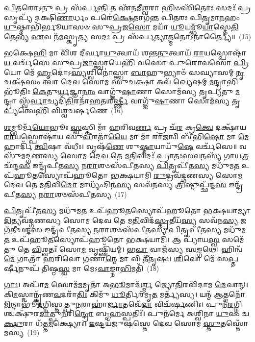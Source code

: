 \-\ul{𑌪𑌿}\-𑌤𑌰𑍋\-𑌽\-\ul{𑌨𑍁} 𑌪𑍍𑌰 𑌸᳴𑌰𑍍𑌪\-\ul{𑌨𑍍𑌤𑌿} 𑌤 𑌏᳴𑌨𑌮𑍀\-\ul{𑌶𑍍𑌵}\-𑌰𑌾 𑌹𑌿𑍞𑌸𑌿᳴\-\ul{𑌤𑍋𑌃} 𑌸𑌦𑌃᳴ \ul{𑌪𑍍𑌰}\-𑌸𑍃𑌪𑍍𑌯᳴ 𑌦𑌕𑍍𑌷𑌿\-\ul{𑌣𑌾}\-𑌰𑍍𑌧𑌂 𑌪𑌰𑍇॑\-\ul{𑌕𑍍𑌷𑍇}\-𑌤𑌾𑌗᳴𑌨𑍍𑌤 𑌪𑌿𑌤𑌰𑌃 𑌪𑌿\-\ul{𑌤𑍃}\-𑌮𑌾\-\ul{𑌨}\-𑌹𑌂 \ul{𑌯𑍁}\-𑌷𑍍𑌮𑌾𑌭𑌿᳴𑌰𑍍𑌭𑍂𑌯𑌾𑌸𑍞 𑌸𑍁\-\ul{𑌪𑍍𑌰}\-𑌜\-\ul{𑌸𑍋} 𑌮𑌯𑌾᳴ \ul{𑌯𑍂}\-𑌯𑌮𑍍𑌭𑍂᳴\-\ul{𑌯𑌾}\-𑌸𑍍𑌤𑍇\-\ul{𑌤𑌿} 𑌤𑍇𑌭𑍍𑌯᳴ \ul{𑌏}\-𑌵 𑌨᳴\-\ul{𑌮}\-𑌸𑍍𑌕𑍃\-\ul{𑌤𑍍𑌯} 𑌸\-\ul{𑌦𑌃} 𑌪𑍍𑌰 𑌸᳴𑌰𑍍𑌪\-\ul{𑌤𑍍𑌯𑌾}\-𑌤𑍍𑌮𑌨𑍋\-𑌽𑌨𑌾॑𑌰𑍍𑌤𑍍𑌯𑍈॥~(15)

{\anuvakamend[{\-\ul{𑌮}\-𑌖𑍋 𑌵𑌾 \ul{𑌅}\-𑌨𑍍𑌤𑌰𑌿᳴𑌕𑍍𑌷𑌾\-\ul{𑌤𑍍𑌪𑍍𑌰}\-𑌸𑌰𑍍𑌪᳴\-\ul{𑌨𑍍𑌤}\-𑌨𑍍𑌤𑍍𑌰𑌯᳴𑌸𑍍𑌤𑍍𑌰𑌿𑍞𑌶𑌚𑍍𑌚}]}%

𑌭𑌕𑍍𑌷𑍇\-\ul{𑌹𑌿} 𑌮𑌾 𑌵𑌿᳴𑌶 𑌦𑍀𑌰𑍍𑌘𑌾\-\ul{𑌯𑍁}\-𑌤𑍍𑌵𑌾𑌯᳴ 𑌶𑌨𑍍𑌤\-\ul{𑌨𑍁}\-𑌤𑍍𑌵𑌾𑌯᳴ \ul{𑌰𑌾}\-𑌯𑌸𑍍𑌪𑍋𑌷𑌾᳴\-\ul{𑌯} 𑌵𑌰𑍍𑌚᳴𑌸𑍇 𑌸𑍁𑌪𑍍𑌰\-\ul{𑌜𑌾}\-𑌸𑍍𑌤𑍍𑌵𑌾𑌯𑍇𑌹𑌿᳴ 𑌵𑌸𑍋 𑌪𑍁𑌰𑍋𑌵𑌸𑍋 \ul{𑌪𑍍𑌰𑌿}\-𑌯𑍋 𑌮𑍇᳴ \ul{𑌹𑍃}\-𑌦𑍋॑\-𑌽\-\ul{𑌸𑍍𑌯}\-𑌶𑍍𑌵𑌿𑌨𑍋॑𑌸𑍍𑌤𑍍𑌵𑌾 \ul{𑌬𑌾}\-𑌹𑍁𑌭𑍍𑌯𑌾𑍞᳴ 𑌸𑌘𑍍𑌯𑌾𑌸𑌮𑍍 \ul{𑌨𑍃}\-𑌚𑌕𑍍𑌷᳴𑌸𑌂 𑌤𑍍𑌵𑌾 𑌦𑍇𑌵 𑌸𑍋𑌮 \ul{𑌸𑍁}\-𑌚\-\ul{𑌕𑍍𑌷𑌾} 𑌅𑌵᳴ 𑌖𑍍𑌯𑍇𑌷𑌮𑍍 \ul{𑌮}\-𑌨𑍍𑌦𑍍𑌰𑌾𑌭𑌿𑌭𑍂᳴𑌤𑌿𑌃 \ul{𑌕𑍇}\-𑌤𑍁\-\ul{𑌰𑍍𑌯}\-𑌜𑍍𑌞𑌾\-\ul{𑌨𑌾𑌂} 𑌵𑌾𑌗𑍍𑌜𑍁᳴\-\ul{𑌷𑌾}\-𑌣𑌾 𑌸𑍋𑌮᳴𑌸𑍍𑌯 𑌤𑍃𑌪𑍍𑌯𑌤𑍁 \ul{𑌮}\-𑌨𑍍𑌦𑍍𑌰𑌾 𑌸𑍍𑌵᳴\-\ul{𑌰𑍍𑌵𑌾}\-𑌚𑍍𑌯𑌦𑌿᳴\-\ul{𑌤𑌿}\-𑌰𑌨𑌾᳴𑌹𑌤𑌶𑍀\-\ul{𑌰𑍍𑌷𑍍𑌣𑍀} 𑌵𑌾𑌗𑍍𑌜𑍁᳴\-\ul{𑌷𑌾}\-𑌣𑌾 𑌸𑍋𑌮᳴𑌸𑍍𑌯 𑌤𑍃\-\ul{𑌪𑍍𑌯}\-𑌤𑍍𑌵𑍇𑌹𑌿᳴ 𑌵𑌿𑌶𑍍𑌵𑌚𑌰𑍍\mbox{}𑌷𑌣𑍇~(16)

\-\ul{𑌶}\-𑌮𑍍𑌭𑍂𑌰𑍍𑌮᳴\-\ul{𑌯𑍋}\-𑌭𑍂𑌃 \ul{𑌸𑍍𑌵}\-𑌸𑍍𑌤𑌿 𑌮𑌾᳴ 𑌹𑌰𑌿𑌵\-\ul{𑌰𑍍𑌣} 𑌪𑍍𑌰 𑌚᳴\-\ul{𑌰} 𑌕𑍍𑌰\-\ul{𑌤𑍍𑌵𑍇} 𑌦𑌕𑍍𑌷𑌾᳴𑌯 \ul{𑌰𑌾}\-𑌯𑌸𑍍𑌪𑍋𑌷𑌾᳴𑌯 𑌸𑍁\-\ul{𑌵𑍀}\-𑌰𑌤𑌾᳴\-\ul{𑌯𑍈} 𑌮𑌾 𑌮𑌾᳴ 𑌰𑌾\-\ul{𑌜}\-𑌨𑍍𑌵𑌿 𑌬𑍀᳴𑌭𑌿\-\ul{𑌷𑍋} 𑌮𑌾 \ul{𑌮𑍇} 𑌹𑌾𑌰𑍍𑌦𑌿᳴ \ul{𑌤𑍍𑌵𑌿}\-𑌷𑌾 𑌵᳴𑌧𑍀𑌃। 𑌵𑍃𑌷᳴\-\ul{𑌣𑍇} 𑌶𑍁\-\ul{𑌷𑍍𑌮𑌾}\-𑌯𑌾𑌯𑍁᳴\-\ul{𑌷𑍇} 𑌵𑌰𑍍𑌚᳴𑌸𑍇॥ 𑌵𑌸𑍁᳴𑌮𑌦𑍍𑌗𑌣𑌸𑍍𑌯 𑌸𑍋𑌮 𑌦𑍇𑌵 𑌤𑍇 𑌮\-\ul{𑌤𑌿}\-𑌵𑌿𑌦𑌃᳴ 𑌪𑍍𑌰𑌾𑌤𑌃𑌸\-\ul{𑌵}\-𑌨𑌸𑍍𑌯᳴ 𑌗𑌾\-\ul{𑌯}\-𑌤𑍍𑌰𑌛᳴𑌨𑍍𑌦\-\ul{𑌸} 𑌇𑌨𑍍𑌦𑍍𑌰᳴𑌪𑍀𑌤\-\ul{𑌸𑍍𑌯} 𑌨\-\ul{𑌰𑌾}\-𑌶𑍞𑌸᳴𑌪𑍀𑌤𑌸𑍍𑌯 \ul{𑌪𑌿}\-𑌤𑍃𑌪𑍀᳴𑌤\-\ul{𑌸𑍍𑌯} 𑌮𑌧𑍁᳴𑌮\-\ul{𑌤} 𑌉𑌪᳴𑌹𑍂\-\ul{𑌤}\-𑌸𑍍𑌯𑍋𑌪᳴𑌹𑍂𑌤𑍋 𑌭𑌕𑍍𑌷𑌯𑌾𑌮𑌿 \ul{𑌰𑍁}\-𑌦𑍍𑌰𑌵᳴𑌦𑍍𑌗𑌣𑌸𑍍𑌯 𑌸𑍋𑌮 𑌦𑍇𑌵 𑌤𑍇 𑌮\-\ul{𑌤𑌿}\-𑌵𑌿\-\ul{𑌦𑍋} 𑌮𑌾𑌧𑍍𑌯𑌂᳴𑌦𑌿𑌨\-\ul{𑌸𑍍𑌯} 𑌸𑌵᳴𑌨𑌸𑍍𑌯 \ul{𑌤𑍍𑌰𑌿}\-𑌷𑍍𑌟𑍁𑌪𑍍𑌛᳴𑌨𑍍𑌦\-\ul{𑌸} 𑌇𑌨𑍍𑌦𑍍𑌰᳴𑌪𑍀𑌤\-\ul{𑌸𑍍𑌯} 𑌨\-\ul{𑌰𑌾}\-𑌶𑍞𑌸᳴𑌪𑍀𑌤𑌸𑍍𑌯~(17)

\-\ul{𑌪𑌿}\-𑌤𑍃𑌪𑍀᳴𑌤\-\ul{𑌸𑍍𑌯} 𑌮𑌧𑍁᳴𑌮\-\ul{𑌤} 𑌉𑌪᳴𑌹𑍂\-\ul{𑌤}\-𑌸𑍍𑌯𑍋𑌪᳴𑌹𑍂𑌤𑍋 𑌭𑌕𑍍𑌷𑌯𑌾𑌮𑍍𑌯𑌾\-\ul{𑌦𑌿}\-𑌤𑍍𑌯𑌵᳴𑌦𑍍𑌗𑌣𑌸𑍍𑌯 𑌸𑍋𑌮 𑌦𑍇𑌵 𑌤𑍇 𑌮\-\ul{𑌤𑌿}\-𑌵𑌿𑌦᳴\-\ul{𑌸𑍍𑌤𑍃}\-𑌤𑍀𑌯᳴\-\ul{𑌸𑍍𑌯} 𑌸𑌵᳴𑌨\-\ul{𑌸𑍍𑌯} 𑌜𑌗᳴𑌤𑍀𑌛𑌨𑍍𑌦\-\ul{𑌸} 𑌇𑌨𑍍𑌦𑍍𑌰᳴𑌪𑍀𑌤\-\ul{𑌸𑍍𑌯} 𑌨\-\ul{𑌰𑌾}\-𑌶𑍞𑌸᳴𑌪𑍀𑌤𑌸𑍍𑌯 \ul{𑌪𑌿}\-𑌤𑍃𑌪𑍀᳴𑌤\-\ul{𑌸𑍍𑌯} 𑌮𑌧𑍁᳴𑌮\-\ul{𑌤} 𑌉𑌪᳴𑌹𑍂\-\ul{𑌤}\-𑌸𑍍𑌯𑍋𑌪᳴𑌹𑍂𑌤𑍋 𑌭𑌕𑍍𑌷𑌯𑌾𑌮𑌿। 𑌆 𑌪𑍍𑌯𑌾᳴𑌯\-\ul{𑌸𑍍𑌵} 𑌸𑌮𑍇᳴𑌤𑍁 𑌤𑍇 \ul{𑌵𑌿}\-𑌶𑍍𑌵𑌤𑌃᳴ 𑌸𑍋\-\ul{𑌮} 𑌵𑍃𑌷𑍍𑌣𑌿᳴𑌯𑌮𑍍। 𑌭\-\ul{𑌵𑌾} 𑌵𑌾𑌜᳴𑌸𑍍𑌯 𑌸\-\ul{𑌙𑍍𑌗}\-𑌥𑍇। 𑌹𑌿𑌨𑍍𑌵᳴ \ul{𑌮𑍇} 𑌗𑌾𑌤𑍍𑌰𑌾᳴ 𑌹𑌰𑌿𑌵𑍋 \ul{𑌗}\-𑌣𑌾\-\ul{𑌨𑍍𑌮𑍇} 𑌮𑌾 𑌵𑌿 𑌤𑍀᳴𑌤𑍃𑌷𑌃। \ul{𑌶𑌿}\-𑌵𑍋 𑌮𑍇᳴ 𑌸\-\ul{𑌪𑍍𑌤}\-𑌰𑍍\mbox{}𑌷𑍀𑌨𑍁𑌪᳴ 𑌤𑌿𑌷𑍍𑌠\-\ul{𑌸𑍍𑌵} 𑌮𑌾 𑌮𑍇\-𑌽\-\ul{𑌵𑌾}\-𑌙𑍍𑌨𑌾\-\ul{𑌭𑌿}\-𑌮𑌤𑌿᳴~(18)

\-\ul{𑌗𑌾𑌃}\-। 𑌅𑌪𑌾᳴\-\ul{𑌮} 𑌸𑍋𑌮᳴\-\ul{𑌮}\-𑌮𑍃𑌤𑌾᳴ 𑌅\-\ul{𑌭𑍂}\-𑌮𑌾𑌦᳴\-\ul{𑌰𑍍𑌶𑍍𑌮} 𑌜𑍍𑌯𑍋\-\ul{𑌤𑌿}\-𑌰𑌵𑌿᳴𑌦𑌾𑌮 \ul{𑌦𑍇}\-𑌵𑌾𑌨𑍍। 𑌕𑌿\-\ul{𑌮}\-𑌸𑍍𑌮𑌾𑌨𑍍𑌕𑍃᳴𑌣\-\ul{𑌵}\-𑌦𑌰𑌾᳴\-\ul{𑌤𑌿𑌃} 𑌕𑌿𑌮𑍁᳴ \ul{𑌧𑍂}\-𑌰𑍍𑌤𑌿𑌰᳴𑌮𑍃\-\ul{𑌤} 𑌮𑌰𑍍𑌤𑍍𑌯᳴𑌸𑍍𑌯। 𑌯𑌨𑍍𑌮᳴ \ul{𑌆}\-𑌤𑍍𑌮𑌨𑍋᳴ \ul{𑌮𑌿}\-𑌨𑍍𑌦𑌾𑌭𑍂᳴\-\ul{𑌦}\-𑌗𑍍𑌨𑌿𑌸𑍍𑌤𑌤𑍍𑌪𑍁\-\ul{𑌨}\-𑌰𑌾𑌹𑌾॑\-\ul{𑌰𑍍𑌜𑌾}\-𑌤𑌵𑍇᳴\-\ul{𑌦𑌾} 𑌵𑌿𑌚᳴𑌰𑍍\mbox{}𑌷𑌣𑌿𑌃। 𑌪𑍁𑌨᳴\-\ul{𑌰}\-𑌗𑍍𑌨𑌿𑌶𑍍𑌚𑌕𑍍𑌷𑍁᳴𑌰\-\ul{𑌦𑌾}\-𑌤𑍍𑌪𑍁\-\ul{𑌨}\-𑌰𑌿\-\ul{𑌨𑍍𑌦𑍍𑌰𑍋} 𑌬𑍃\-\ul{𑌹}\-𑌸𑍍𑌪𑌤𑌿𑌃᳴। 𑌪𑍁𑌨᳴𑌰𑍍𑌮𑍇 𑌅𑌶𑍍𑌵𑌿𑌨𑌾 \ul{𑌯𑍁}\-𑌵𑌂 𑌚\-\ul{𑌕𑍍𑌷𑍁}\-𑌰𑌾 𑌧᳴𑌤𑍍𑌤\-\ul{𑌮}\-𑌕𑍍𑌷𑍍𑌯𑍋𑌃। \ul{𑌇}\-𑌷𑍍𑌟𑌯᳴𑌜𑍁𑌷𑌸𑍍𑌤𑍇 𑌦𑍇𑌵 𑌸𑍋𑌮 \ul{𑌸𑍍𑌤𑍁}\-𑌤𑌸𑍍𑌤𑍋᳴𑌮𑌸𑍍𑌯~(19)

